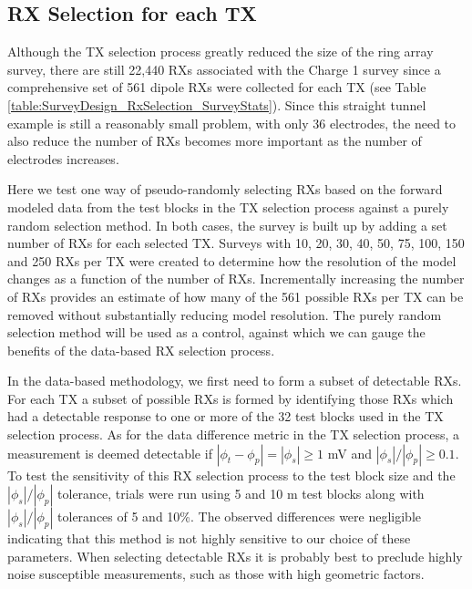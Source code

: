 \documentclass[preprint,authoryear,12pt]{elsarticle}
\begin{document}
\subsection{RX Selection for each TX}
\label{sec:RingArray_SurveyDesign_RXSelection}

Although the TX selection process greatly reduced the size of the ring array survey, there are still 22,440 RXs associated with the Charge 1 survey since a comprehensive set of 561 dipole RXs were collected for each TX (see Table \ref{table:SurveyDesign_RxSelection_SurveyStats}). Since this straight tunnel example is still a reasonably small problem, with only 36 electrodes, the need to also reduce the number of RXs becomes more important as the number of electrodes increases.

Here we test one way of pseudo-randomly selecting RXs based on the forward modeled data from the test blocks in the TX selection process against a purely random selection method. In both cases, the survey is built up by adding a set number of RXs for each selected TX. Surveys with 10, 20, 30, 40, 50, 75, 100, 150 and 250 RXs per TX were created to determine how the resolution of the model changes as a function of the number of RXs. Incrementally increasing the number of RXs provides an estimate of how many of the 561 possible RXs per TX can be removed without substantially reducing model resolution. The purely random selection method will be used as a control, against which we can gauge the benefits of the data-based RX selection process.

In the data-based methodology, we first need to form a subset of detectable RXs. For each TX a subset of possible RXs is formed by identifying those RXs which had a detectable response to one or more of the 32 test blocks used in the TX selection process. As for the data difference metric in the TX selection process, a measurement is deemed detectable if $|\phi_t - \phi_p| = |\phi_s| \geq 1$ mV and  $|\phi_s|/|\phi_p| \geq 0.1$. To test the sensitivity of this RX selection process to the test block size and the $|\phi_s|/|\phi_p|$ tolerance, trials were run using 5 and 10 m test blocks along with $|\phi_s|/|\phi_p|$ tolerances of 5 and 10\%. The observed differences were negligible indicating that this method is not highly sensitive to our choice of these parameters. When selecting detectable RXs it is probably best to preclude highly noise susceptible measurements, such as those with high geometric factors.
\end{document}
